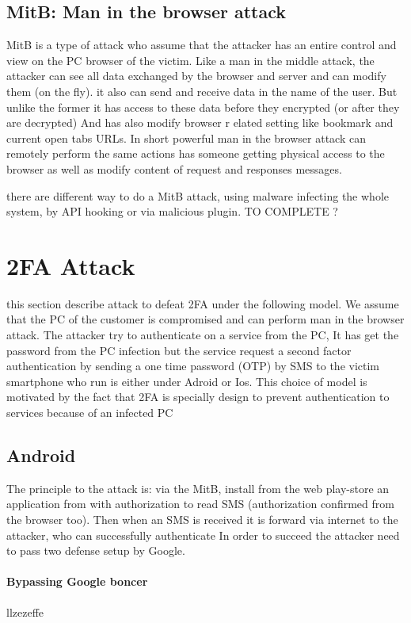 \documentclass[11pt, a4paper,twocolumn]{article}
\begin{document}
\subsection{MitB: Man in the browser attack}
MitB is a type of attack who assume that the attacker has an entire control and view on the PC browser of the victim. Like a man in the middle attack, the attacker can see all data 
exchanged by the browser and server and can modify them (on the fly). it also can send and receive data in the name of the user. But unlike the former it has access to these data before they encrypted (or after they are decrypted) And has also modify browser r elated setting like bookmark and current open tabs URLs. In short powerful man in the browser attack can remotely perform the same actions has someone getting physical access to the browser as well as modify content of request and responses messages.

there are different way to do a MitB attack, using malware infecting the whole system, by API hooking or via malicious plugin. TO COMPLETE ?


\section{2FA Attack}
 this section describe attack to defeat 2FA under the following model. We assume that the PC of the customer is compromised and can perform man in the browser attack. The attacker try to authenticate on a service from the PC, It has get the password from the PC infection but the service request a second factor authentication by sending a one time password (OTP) by SMS to the victim smartphone who run is either under Adroid or Ios. 
This choice of model is motivated by the fact that 2FA is specially design to prevent authentication to services because of an infected PC 
\subsection{Android}
The principle to the attack is: via the MitB, install from the web play-store  an application from with authorization to read SMS (authorization confirmed from the browser too). Then when an SMS is received it is forward via internet to the attacker, who can successfully authenticate In order to succeed the attacker need to pass two defense setup by Google.

\paragraph{Bypassing Google boncer} llzezeffe
\end{document}
